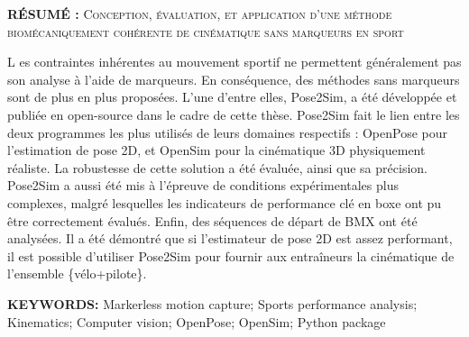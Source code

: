 \vspace*{3cm}

\noindent\textbf{RÉSUMÉ : } \textsc{Conception, évaluation, et application d’une méthode biomécaniquement cohérente de cinématique sans marqueurs en sport}

\lettrine[lines=1]{L}{ }es contraintes inhérentes au mouvement sportif ne permettent généralement pas son analyse à l'aide de marqueurs. En conséquence, des méthodes sans marqueurs sont de plus en plus proposées. L'une d'entre elles, Pose2Sim, a été développée et publiée en open-source dans le cadre de cette thèse. Pose2Sim fait le lien entre les deux programmes les plus utilisés de leurs domaines respectifs : OpenPose pour l'estimation de pose 2D, et OpenSim pour la cinématique 3D physiquement réaliste. La robustesse de cette solution a été évaluée, ainsi que sa précision. Pose2Sim a aussi été mis à l'épreuve de conditions expérimentales plus complexes, malgré lesquelles les indicateurs de performance clé en boxe ont pu être correctement évalués. Enfin, des séquences de départ de BMX ont été analysées. Il a été démontré que si l'estimateur de pose 2D est assez performant, il est possible d'utiliser Pose2Sim pour fournir aux entraîneurs la cinématique de l'ensemble \{vélo+pilote\}.

\vspace*{3cm}
\noindent\textbf{KEYWORDS:} Markerless motion capture; Sports performance analysis; Kinematics; Computer vision; OpenPose; OpenSim; Python package






